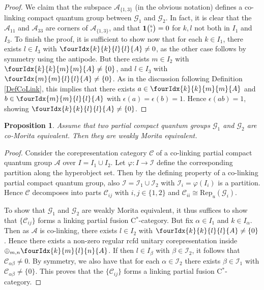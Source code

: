 \documentclass[10pt]{article}
\newcommand{\CatC}{\mathcal{C}}
\newcommand{\CatCC}{\mathscr{C}}
\newcommand{\Rep}{\mathrm{Rep}}
\newcommand{\Grt}[3]{#1{\tiny{\begin{pmatrix} #2\\#3\end{pmatrix}}}}
\newcommand{\UnitC}[2]{\Grt{\mathbf{1}}{#1}{#2}}
\newcommand{\Gr}[5]{\fourIdx{#2}{#4}{#3}{#5}{#1}}%
\newtheorem{Prop}[Theorem]{Proposition}
\theoremstyle{definition}
\numberwithin{equation}{section}
\begin{document}
\begin{proof}
We claim that the subspace $\mathscr{A}_{\{1,3\}}$ (in the obvious notation) defines a co-linking compact quantum group between $\mathscr{G}_1$ and $\mathscr{G}_2$. In fact, it is clear that the $\mathscr{A}_{11}$ and $\mathscr{A}_{33}$ are corners of $\mathscr{A}_{\{1,3\}}$, and that $\UnitC{k}{l}=0$ for $k,l$ not both in $I_1$ and $I_{3}$. To finish the proof, it is sufficient to show now that for each $k\in I_1$, there exists $l\in I_{3}$ with $\Gr{A}{k}{l}{k}{l}\neq 0$, as the other case follows by symmetry using the antipode. But there exists $m\in I_2$ with $\Gr{A}{k}{m}{k}{m} \neq \{0\}$, and $l\in I_3$ with $\Gr{A}{m}{l}{m}{l}\neq\{0\}$. As in the discussion following Definition \ref{DefCoLink}, this implies that there exists $a\in \Gr{A}{k}{m}{k}{m}$ and $b\in \Gr{A}{m}{l}{m}{l}$ with $\epsilon(a)=\epsilon(b)=1$. Hence $\epsilon(ab)=1$, showing $\Gr{A}{k}{l}{k}{l}\neq \{0\}$.
\end{proof} 

\begin{Prop}\label{PropCoWeak} Assume that two partial compact quantum groups $\mathscr{G}_1$ and $\mathscr{G}_2$ are co-Morita equivalent. Then they are weakly Morita equivalent.
\end{Prop} 
\begin{proof} 
Consider the corepresentation category $\CatCC$ of a co-linking partial compact quantum group $\mathscr{A}$ over $I = I_1\cup I_2$. Let $\varphi:I\rightarrow \mathscr{I}$ define the corresponding partition along the hyperobject set. Then by the defining property of a co-linking partial compact quantum group, also $\mathscr{I} = \mathscr{I}_1\cup \mathscr{I}_2$ with $\mathscr{I}_i=\varphi(I_i)$ is a partition. Hence $\CatCC$ decomposes into parts $\CatCC_{ij}$ with $i,j\in \{1,2\}$ and $\CatC_{ii}\cong \Rep_u(\mathscr{G}_i)$. 

To show that $\mathscr{G}_1$ and $\mathscr{G}_2$ are weakly Morita equivalent, it thus suffices to show that $\{\CatCC_{ij}\}$ forms a linking partial fusion C$^*$-category. But fix $\alpha\in I_1$ and $k\in I_{\alpha}$. Then as $\mathscr{A}$ is co-linking, there exists $l \in I_2$ with $\Gr{A}{k}{l}{k}{l}\neq \{0\}$. Hence there exists a non-zero regular rcfd unitary corepresentation inside $\oplus_{m,n}\Gr{A}{k}{l}{m}{n}$. If then $l\in I_{\beta}$ with $\beta\in \mathscr{I}_2$, it follows that $\CatC_{\alpha\beta}\neq 0$. By symmetry, we also have that for each $\alpha \in \mathscr{I}_2$ there exists $\beta \in \mathscr{I}_1$ with $\CatC_{\alpha\beta}\neq \{0\}$. This proves that the $\{\CatCC_{ij}\}$ forms a linking partial fusion C$^*$-category.
\end{proof}
\end{document}

